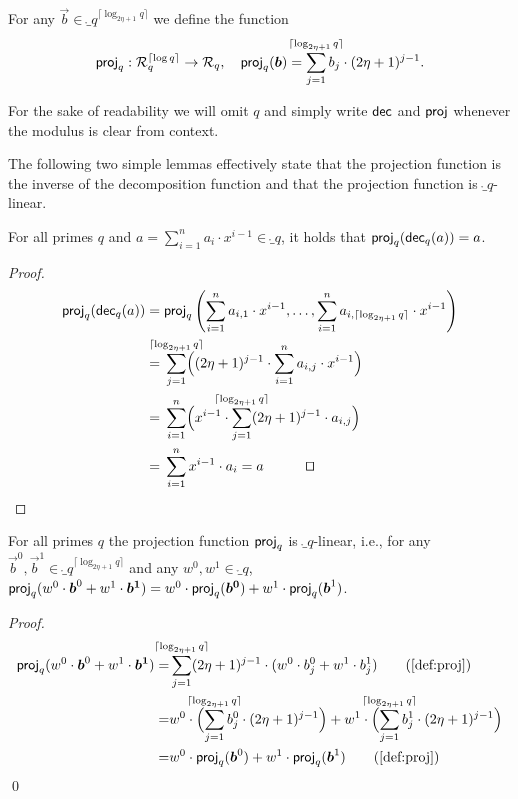 \begin{definition}\label{def:proj}
  For any $\vec{b} \in \ring_q^{\lceil\log_{2\eta+1} q\rceil}$ we define the function 
  \[
    \proj_q : \ring_q^{\lceil\log q\rceil} \to \ring_q,\quad \proj_q(\vec{b}) = \smashoperator{\sum_{j=1}^{\lceil\log_{2\eta+1} q\rceil}} b_j\cdot(2\eta+1)^{j-1}.
  \]
\end{definition}

For the sake of readability we will omit $q$ and simply write $\mathsf{dec}$ and $\mathsf{proj}$ whenever the modulus is clear from context.

The following two simple lemmas effectively state that the projection function is the inverse of the decomposition function and that the projection function is $\ring_q$-linear.
\begin{lemma}\label{lem:projinvofbin}
  For all primes $q$ and $a = \sum_{i=1}^{n} a_i\cdot x^{i-1} \in\ring_q$, it holds that $\mathsf{proj}_q(\mathsf{dec}_q(a))=a$.
\end{lemma}
\begin{proof}
    \begin{align*}
      \proj_q(\decomp_q(a)) ={}& \proj_q\left(\sum_{i=1}^{n} a_{i,1}\cdot x^{i-1}, \dots, \sum_{i=1}^{n} a_{i,\lceil\log_{2\eta+1} q\rceil}\cdot x^{i-1}\right)\\
      ={}& \smashoperator{\sum_{j=1}^{\lceil\log_{2\eta+1} q\rceil}} \Bigl((2\eta+1)^{j-1} \cdot \sum_{i=1}^{n} a_{i,j}\cdot x^{i-1}\Bigr)\\
      ={}& \sum_{i=1}^{n} \Bigl(x^{i-1}\cdot \smashoperator{\sum_{j=1}^{\lceil\log_{2\eta+1} q\rceil}} (2\eta+1)^{j-1} \cdot a_{i,j}\Bigr)\\
      ={}& \sum_{i=1}^{n} x^{i-1}\cdot a_i=a\tag*{\qed}
    \end{align*}
\end{proof}
  

\begin{lemma}\label{lem:projislin}
  For all primes $q$ the projection function $\mathsf{proj}_q$ is $\ring_q$-linear, i.e., for any $\vec{b}^0,\vec{b}^1 \in \ring_q^{\lceil\log_{2\eta+1} q\rceil}$ and any $w^0,w^1 \in \ring_q$, $\mathsf{proj}_q(w^0\cdot\boldsymbol{b}^0+w^1\cdot\boldsymbol{b^1}) = w^0\cdot\mathsf{proj}_q(\boldsymbol{b^0}) + w^1\cdot\mathsf{proj}_q(\boldsymbol{b}^1)$.
\end{lemma}
\begin{proof}
  \begin{align*}
    \vspace{-1cm}
    \proj_q(w^0\cdot\vec{b}^0+w^1\cdot\vec{b^1})
    =&\smashoperator{\sum_{j=1}^{\lceil\log_{2\eta+1} q\rceil}} (2\eta+1)^{j-1}\cdot (w^0\cdot b^0_j+w^1\cdot b^1_j)\tag{\autoref{def:proj}}\\
    =&w^0\cdot \Bigl(\smashoperator{\sum_{j=1}^{\lceil\log_{2\eta+1} q\rceil}} b^0_j\cdot (2\eta+1)^{j-1}\Bigr) + w^1\cdot\Bigl( \smashoperator{\sum_{j=1}^{\lceil\log_{2\eta+1} q\rceil}} b^1_j\cdot (2\eta+1)^{j-1}\Bigr)\\
    =&w^0\cdot \proj_q(\vec{b}^0) + w^1\cdot\proj_q(\vec{b}^1)\tag{\autoref{def:proj}}
  \end{align*}
  \qed
\end{proof}

